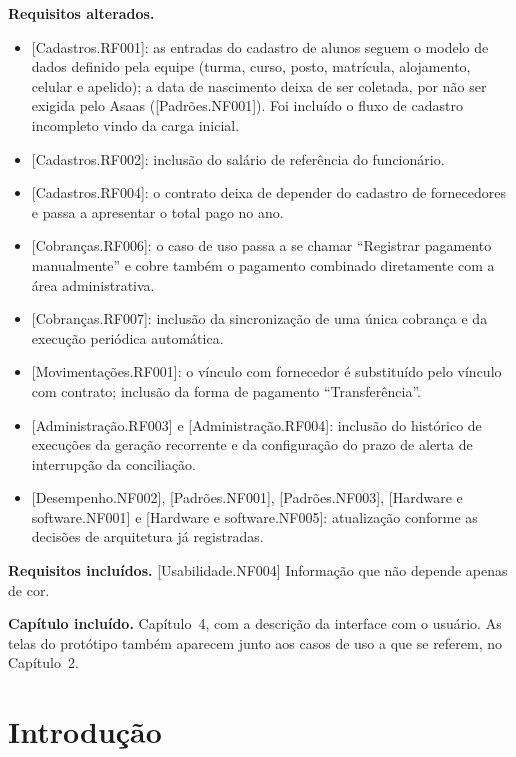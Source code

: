 \documentclass[11pt,a4paper,oneside]{report}
\begin{document}
\textbf{Requisitos alterados.}
\begin{itemize}
  \item {[Cadastros.RF001]}: as entradas do cadastro de alunos seguem o modelo de dados definido pela
        equipe (turma, curso, posto, matrícula, alojamento, celular e apelido); a data de
        nascimento deixa de ser coletada, por não ser exigida pelo Asaas
        ([Padrões.NF001]). Foi incluído o fluxo de cadastro incompleto vindo da carga inicial.
  \item {[Cadastros.RF002]}: inclusão do salário de referência do funcionário.
  \item {[Cadastros.RF004]}: o contrato deixa de depender do cadastro de fornecedores e passa a
        apresentar o total pago no ano.
  \item {[Cobranças.RF006]}: o caso de uso passa a se chamar ``Registrar pagamento manualmente'' e
        cobre também o pagamento combinado diretamente com a área administrativa.
  \item {[Cobranças.RF007]}: inclusão da sincronização de uma única cobrança e da execução periódica
        automática.
  \item {[Movimentações.RF001]}: o vínculo com fornecedor é substituído pelo vínculo com contrato;
        inclusão da forma de pagamento ``Transferência''.
  \item {[Administração.RF003]} e [Administração.RF004]: inclusão do histórico de execuções da
        geração recorrente e da configuração do prazo de alerta de interrupção da conciliação.
  \item {[Desempenho.NF002]}, [Padrões.NF001], [Padrões.NF003], [Hardware e software.NF001] e
        [Hardware e software.NF005]: atualização conforme as decisões de arquitetura já
        registradas.
\end{itemize}

\textbf{Requisitos incluídos.} [Usabilidade.NF004] Informação que não depende apenas de cor.

\textbf{Capítulo incluído.} Capítulo~4, com a descrição da interface com o usuário. As telas do
protótipo também aparecem junto aos casos de uso a que se referem, no Capítulo~2.

\tableofcontents


\chapter*{Introdução}
\end{document}
